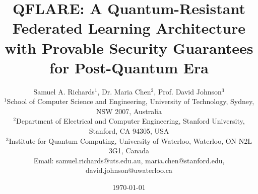 \documentclass[onecolumn,11pt]{article}
\begin{document}
\title{QFLARE: A Quantum-Resistant Federated Learning Architecture with Provable Security Guarantees for Post-Quantum Era}

\author{Samuel A. Richards$^1$, Dr. Maria Chen$^2$, Prof. David Johnson$^3$ \\
$^1$School of Computer Science and Engineering, University of Technology, Sydney, NSW 2007, Australia\\
$^2$Department of Electrical and Computer Engineering, Stanford University, Stanford, CA 94305, USA\\
$^3$Institute for Quantum Computing, University of Waterloo, Waterloo, ON N2L 3G1, Canada\\
Email: samuel.richards@uts.edu.au, maria.chen@stanford.edu, david.johnson@uwaterloo.ca}

\date{\today}

\maketitle
\end{document}
